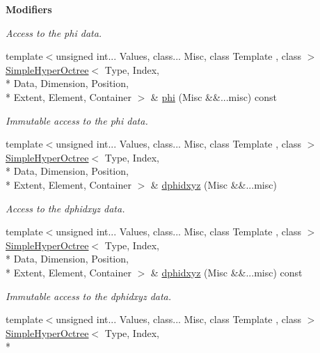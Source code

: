 \begin{Indent}{\bf Modifiers}
\begin{DoxyCompactItemize}
\begin{DoxyCompactList}\small\item\em Access to the phi data. \end{DoxyCompactList}\item 
{\footnotesize template$<$unsigned int... Values, class... Misc, class Template , class $>$ }\\\hyperlink{exceptionmagrathea_1_1SimpleHyperOctree}{Simple\-Hyper\-Octree}$<$ Type, Index, \\*
Data, Dimension, Position, \\*
Extent, Element, Container $>$ \& \hyperlink{exceptionmagrathea_1_1SimpleHyperOctree_abf4fb49ec2a6f93966c12c8f31bfc5ed}{phi} (Misc \&\&...misc) const 
\begin{DoxyCompactList}\small\item\em Immutable access to the phi data. \end{DoxyCompactList}\item 
{\footnotesize template$<$unsigned int... Values, class... Misc, class Template , class $>$ }\\\hyperlink{exceptionmagrathea_1_1SimpleHyperOctree}{Simple\-Hyper\-Octree}$<$ Type, Index, \\*
Data, Dimension, Position, \\*
Extent, Element, Container $>$ \& \hyperlink{exceptionmagrathea_1_1SimpleHyperOctree_a4267d8f6aa4699ae060027a4f08c0fcc}{dphidxyz} (Misc \&\&...misc)
\begin{DoxyCompactList}\small\item\em Access to the dphidxyz data. \end{DoxyCompactList}\item 
{\footnotesize template$<$unsigned int... Values, class... Misc, class Template , class $>$ }\\\hyperlink{exceptionmagrathea_1_1SimpleHyperOctree}{Simple\-Hyper\-Octree}$<$ Type, Index, \\*
Data, Dimension, Position, \\*
Extent, Element, Container $>$ \& \hyperlink{exceptionmagrathea_1_1SimpleHyperOctree_a78599c42c748f305f926b2343345a8bb}{dphidxyz} (Misc \&\&...misc) const 
\begin{DoxyCompactList}\small\item\em Immutable access to the dphidxyz data. \end{DoxyCompactList}\item 
{\footnotesize template$<$unsigned int... Values, class... Misc, class Template , class $>$ }\\\hyperlink{exceptionmagrathea_1_1SimpleHyperOctree}{Simple\-Hyper\-Octree}$<$ Type, Index, \\*

\end{DoxyCompactItemize}
\end{Indent}
